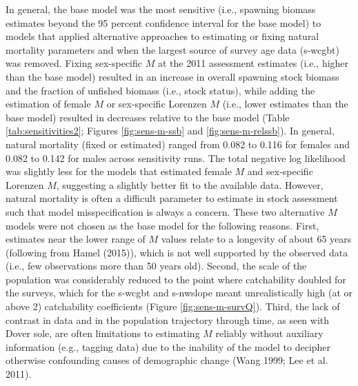 \documentclass[11pt,
  english,
  a4paper,
]{article}
\begin{document}
In general, the base model was the most sensitive (i.e., spawning biomass estimates beyond the 95 percent confidence interval for the base model) to models that applied alternative approaches to estimating or fixing natural mortality parameters and when the largest source of survey age data (\gls{s-wcgbt}) was removed. Fixing sex-specific {\(M\)\leavevmode\tagmcend\tagstructend} at the 2011 assessment estimates (i.e., higher than the base model) resulted in an increase in overall spawning stock biomass and the fraction of unfished biomass (i.e., stock status), while adding the estimation of female {\(M\)\leavevmode\tagmcend\tagstructend} or sex-specific Lorenzen {\(M\)\leavevmode\tagmcend\tagstructend} (i.e., lower estimates than the base model) resulted in decreases relative to the base model (Table \ref{tab:sensitivities2}; Figures \ref{fig:sens-m-ssb} and \ref{fig:sens-m-relssb}). In general, natural mortality (fixed or estimated) ranged from 0.082 to 0.116 for females and 0.082 to 0.142 for males across sensitivity runs. The total negative log likelihood was slightly less for the models that estimated female {\(M\)\leavevmode\tagmcend\tagstructend} and sex-specific Lorenzen {\(M\)\leavevmode\tagmcend\tagstructend}, suggesting a slightly better fit to the available data. However, natural mortality is often a difficult parameter to estimate in stock assessment such that model misspecification is always a concern. These two alternative {\(M\)\leavevmode\tagmcend\tagstructend} models were not chosen as the base model for the following reasons. First, estimates near the lower range of {\(M\)\leavevmode\tagmcend\tagstructend} values relate to a longevity of about 65 years (following from Hamel {(2015)\leavevmode\tagmcend\tagstructend}), which is not well supported by the observed data (i.e., few observations more than 50 years old). Second, the scale of the population was considerably reduced to the point where catchability doubled for the surveys, which for the \gls{s-wcgbt} and \gls{s-nwslope} meant unrealistically high (at or above 2) catchability coefficients (Figure \ref{fig:sens-m-survQ}). Third, the lack of contrast in data and in the population trajectory through time, as seen with Dover sole, are often limitations to estimating {\(M\)\leavevmode\tagmcend\tagstructend} reliably without auxiliary information (e.g., tagging data) due to the inability of the model to decipher otherwise confounding causes of demographic change {(Wang 1999; Lee et al. 2011)\leavevmode\tagmcend\tagstructend}.
\end{document}
